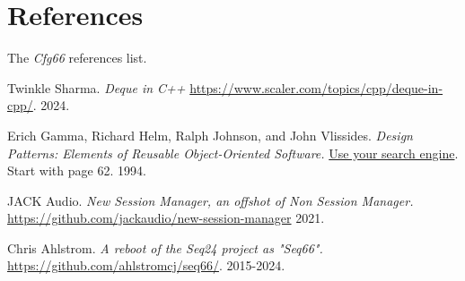 %
%
%

\section{References}
\label{sec:references}

   The \textsl{Cfg66} references list.

{\RaggedRight
\begin{thebibliography}{99}

   Twinkle Sharma.
   \emph{Deque in C++}
   \url{https://www.scaler.com/topics/cpp/deque-in-cpp/}.
   2024.

   Erich Gamma, Richard Helm, Ralph Johnson, and John Vlissides.
   \emph{Design Patterns: Elements of Reusable Object-Oriented Software.}
   \url{Use your search engine}.
   Start with page 62.
   1994.


   JACK Audio.
   \emph{New Session Manager, an offshot of Non Session Manager.}
   \url{https://github.com/jackaudio/new-session-manager}
   2021.

   Chris Ahlstrom.
   \emph{A reboot of the Seq24 project as "Seq66".}
   \url{https://github.com/ahlstromcj/seq66/}.
   2015-2024.

\end{thebibliography}
}

